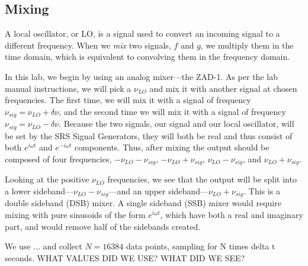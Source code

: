 \documentclass[12pt]{article}
\begin{document}
\subsection*{Mixing} 

A local oscillator, or LO, is a signal used to convert an incoming signal to a different frequency. When we \textit{mix} two signals, $f$ and $g$, we multiply them in the time domain, which is equivalent to convolving them in the frequency domain.

In this lab, we begin by using an analog mixer---the ZAD-1. As per the lab manual instructions, we will pick a $\nu_{LO}$ and mix it with another signal at chosen frequencies. The first time, we will mix it with a signal of frequency $\nu_{sig} = \nu_{LO} + \delta \nu$, and the second time we will mix it with a signal of frequency $\nu_{sig} = \nu_{LO} - \delta \nu$. Because the two signals, our signal and our local oscillator, will be set by the SRS Signal Generators, they will both be real and thus consist of both $e^{i\omega t}$ and $e^{-i\omega t}$ components. Thus, after mixing the output should be composed of four frequencies, $-\nu_{LO} - \nu_{sig}$, $-\nu_{LO} + \nu_{sig}$, $\nu_{LO} - \nu_{sig}$, and $\nu_{LO} + \nu_{sig}$.

Looking at the positive $\nu_{LO}$ frequencies, we see that the output will be split into a lower sideband---$\nu_{LO} - \nu_{sig}$---and an upper sideband---$\nu_{LO} + \nu_{sig}$. This is a double sideband (DSB) mixer. A single sideband (SSB) mixer would require mixing with pure sinusoids of the form $e^{i\omega t}$, which have both a real and imaginary part, and would remove half of the sidebands created.

We use ... and collect $N=16384$ data points, sampling for N times delta t seconds. 
WHAT VALUES DID WE USE?
WHAT DID WE SEE?
\end{document}
